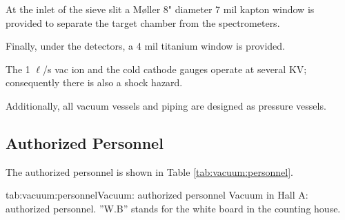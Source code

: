 At the inlet of the sieve slit a M{\o}ller 8" diameter 7 mil kapton window 
is provided to separate the target chamber from the spectrometers.

Finally, under the detectors, a 4 mil titanium window is provided.  

The 1 $\ell$/s vac ion and the cold cathode gauges operate at several 
KV; consequently there is also a shock hazard.

Additionally, all vacuum vessels and piping are designed as pressure 
vessels.

\infolevone{\newpage}
\begin{safetyen}{10}{15}
\section{Authorized Personnel}
\end{safetyen}
The authorized personnel is shown in Table \ref{tab:vacuum:personnel}.
\begin{namestab}{tab:vacuum:personnel}{Vacuum: authorized personnel}{%
      Vacuum in Hall A: authorized personnel. ''W.B'' stands for the white board 
      in the counting house.}
  \EdFolts{}
\end{namestab}


